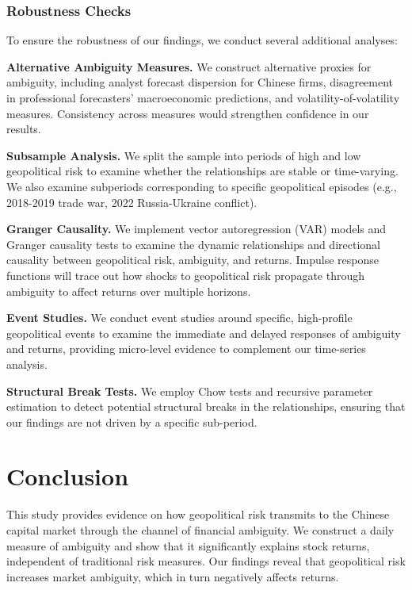 \documentclass[preprint,12pt,authoryear]{elsarticle}
\begin{document}
\subsubsection{Robustness Checks}

To ensure the robustness of our findings, we conduct several additional analyses:

\textbf{Alternative Ambiguity Measures.} We construct alternative proxies for ambiguity, including analyst forecast dispersion for Chinese firms, disagreement in professional forecasters' macroeconomic predictions, and volatility-of-volatility measures. Consistency across measures would strengthen confidence in our results.

\textbf{Subsample Analysis.} We split the sample into periods of high and low geopolitical risk to examine whether the relationships are stable or time-varying. We also examine subperiods corresponding to specific geopolitical episodes (e.g., 2018-2019 trade war, 2022 Russia-Ukraine conflict).

\textbf{Granger Causality.} We implement vector autoregression (VAR) models and Granger causality tests to examine the dynamic relationships and directional causality between geopolitical risk, ambiguity, and returns. Impulse response functions will trace out how shocks to geopolitical risk propagate through ambiguity to affect returns over multiple horizons.

\textbf{Event Studies.} We conduct event studies around specific, high-profile geopolitical events to examine the immediate and delayed responses of ambiguity and returns, providing micro-level evidence to complement our time-series analysis.

\textbf{Structural Break Tests.} We employ Chow tests and recursive parameter estimation to detect potential structural breaks in the relationships, ensuring that our findings are not driven by a specific sub-period.

\section{Conclusion}

This study provides evidence on how geopolitical risk transmits to the Chinese capital market through the channel of financial ambiguity. We construct a daily measure of ambiguity and show that it significantly explains stock returns, independent of traditional risk measures. Our findings reveal that geopolitical risk increases market ambiguity, which in turn negatively affects returns.
\end{document}
